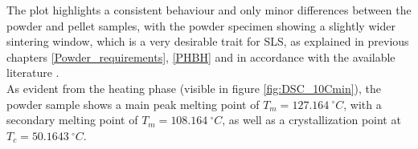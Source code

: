 \documentclass{article}
\begin{document}
%
%
%

        \clearpage

        The plot highlights a consistent behaviour  and only 
        minor differences between the powder and pellet samples, with the powder specimen showing a slightly wider 
        sintering window, which is a very desirable trait for SLS, as explained in 
        previous chapters \ref{Powder_requirements}, \ref{PHBH} and in accordance with 
        the available literature \autocites{Eraslan_PHBH_review,doi:10.1063/1.4918516,DechetMaximilianA2020OtDo}. \\    
        
        As evident from the heating phase (visible in figure \ref{fig:DSC_10Cmin}), the powder sample shows a main peak melting point of $T_{m} =  127.164 \ ^{\circ}C$, with 
        a secondary melting point of $T_{m} =  108.164 \ ^{\circ}C$, as well as a crystallization point at $T_{c} =  50.1643 \ ^{\circ}C$. 
\end{document}
